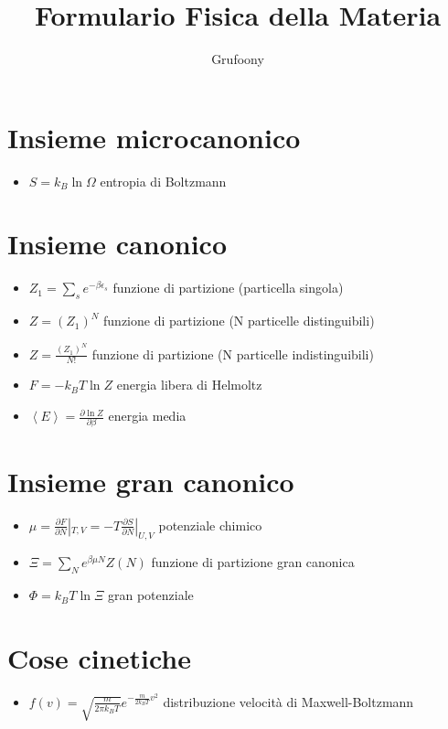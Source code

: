 \documentclass[a4paper]{article}
\begin{document}
	\title{Formulario Fisica della Materia}
	\author{Grufoony}
	\maketitle

    \section{Insieme microcanonico}
        \begin{itemize}
            \item $S=k_B\ln\Omega$ entropia di Boltzmann
        \end{itemize}

    \section{Insieme canonico}
        \begin{itemize}
            \item $Z_1=\sum_s e^{-\beta\epsilon_s}$ funzione di partizione (particella singola)
            \item $Z=(Z_1)^N$ funzione di partizione (N particelle distinguibili)
            \item $Z=\frac{(Z_1)^N}{N!}$ funzione di partizione (N particelle indistinguibili)
            \item $F=-k_BT\ln{Z}$ energia libera di Helmoltz
            \item $\left\langle E \right\rangle = \frac{\partial\ln{Z}}{\partial\beta}$ energia media
        \end{itemize}

    \section{Insieme gran canonico}
        \begin{itemize}
            \item $\mu=\frac{\partial F}{\partial N}|_{T,V}=-T\frac{\partial S}{\partial N}|_{U,V}$ potenziale chimico
            \item $\Xi=\sum_Ne^{\beta\mu N}Z(N)$ funzione di partizione gran canonica
            \item $\Phi=k_BT\ln\Xi$ gran potenziale
        \end{itemize}

    \section{Cose cinetiche}
        \begin{itemize}
            \item $f(v)=\sqrt{\frac{m}{2\pi k_BT}}e^{-\frac{m}{2k_BT}v^2}$ distribuzione velocità di Maxwell-Boltzmann
        \end{itemize}
\end{document}
